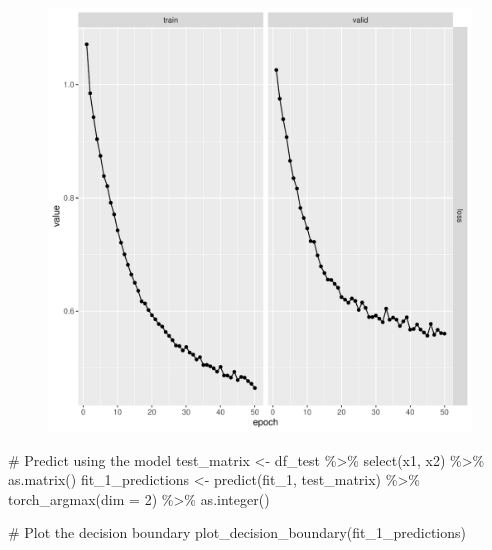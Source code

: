 \documentclass[
  letterpaper,
  DIV=11,
  numbers=noendperiod]{scrartcl}
\newenvironment{Shaded}{\begin{snugshade}}{\end{snugshade}}
\newcommand{\AttributeTok}[1]{\textcolor[rgb]{0.40,0.45,0.13}{#1}}
\newcommand{\CommentTok}[1]{\textcolor[rgb]{0.37,0.37,0.37}{#1}}
\newcommand{\DecValTok}[1]{\textcolor[rgb]{0.68,0.00,0.00}{#1}}
\newcommand{\FunctionTok}[1]{\textcolor[rgb]{0.28,0.35,0.67}{#1}}
\newcommand{\NormalTok}[1]{\textcolor[rgb]{0.00,0.23,0.31}{#1}}
\newcommand{\OtherTok}[1]{\textcolor[rgb]{0.00,0.23,0.31}{#1}}
\newcommand{\SpecialCharTok}[1]{\textcolor[rgb]{0.37,0.37,0.37}{#1}}
\begin{document}
\begin{figure}[H]

{\centering \includegraphics{hw5_files/figure-pdf/unnamed-chunk-32-1.pdf}

}

\end{figure}

\begin{Shaded}
\begin{Highlighting}[]
\CommentTok{\# Predict using the model}
\NormalTok{test\_matrix }\OtherTok{\textless{}{-}}\NormalTok{ df\_test }\SpecialCharTok{\%\textgreater{}\%} \FunctionTok{select}\NormalTok{(x1, x2) }\SpecialCharTok{\%\textgreater{}\%} \FunctionTok{as.matrix}\NormalTok{()}
\NormalTok{fit\_1\_predictions }\OtherTok{\textless{}{-}} \FunctionTok{predict}\NormalTok{(fit\_1, test\_matrix) }\SpecialCharTok{\%\textgreater{}\%}
  \FunctionTok{torch\_argmax}\NormalTok{(}\AttributeTok{dim =} \DecValTok{2}\NormalTok{) }\SpecialCharTok{\%\textgreater{}\%}
  \FunctionTok{as.integer}\NormalTok{()}

\CommentTok{\# Plot the decision boundary}
\FunctionTok{plot\_decision\_boundary}\NormalTok{(fit\_1\_predictions)}
\end{Highlighting}
\end{Shaded}
\end{document}
